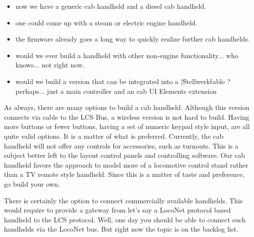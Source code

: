\begin{itemize}
\item now we have a generic cab handheld and a diesel cab handheld.
\item one could come up with a steam or electric engine handheld. 
\item the firmware already goes a long way to quickly realize further cab handhelds.
\item would we ever build a handheld with other non-engine functionality... who knows... not right now.
\item would we build a version that can be integrated into a |\"Stellwerk\" table ? perhaps... just a main controller and an cab UI Elements extension
\end{itemize}

As always, there are many options to build a cab handheld. Although this version connects via cable to the LCS Bus, a wireless version is not hard to build. Having more buttons or fewer buttons, having a set of numeric keypad style input, are all quite valid options. It is a matter of what is preferred. Currently, the cab handheld will not offer any controls for accessories, such as turnouts. This is a subject better left to the layout control panels and controlling software. Our cab handheld favors the approach to model more of a locomotive control stand rather than a TV remote style handheld. Since this is a matter of taste and preference, go build your own.

There is certainly the option to connect commercially available handhelds. This would require to provide a gateway from let's say a LocoNet protocol based handheld to the LCS protocol. Well, one day you should be able to connect such handhelds via the LocoNet bus. But right now the topic is on the backlog list.